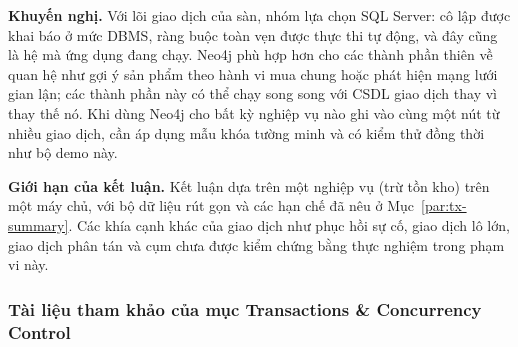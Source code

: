 \textbf{Khuyến nghị.} Với lõi giao dịch của sàn, nhóm lựa chọn SQL Server: cô lập được khai báo ở mức DBMS, ràng buộc toàn vẹn được thực thi tự động, và đây cũng là hệ mà ứng dụng đang chạy. Neo4j phù hợp hơn cho các thành phần thiên về quan hệ như gợi ý sản phẩm theo hành vi mua chung hoặc phát hiện mạng lưới gian lận; các thành phần này có thể chạy song song với CSDL giao dịch thay vì thay thế nó. Khi dùng Neo4j cho bất kỳ nghiệp vụ nào ghi vào cùng một nút từ nhiều giao dịch, cần áp dụng mẫu khóa tường minh và có kiểm thử đồng thời như bộ demo này.

\textbf{Giới hạn của kết luận.} Kết luận dựa trên một nghiệp vụ (trừ tồn kho) trên một máy chủ, với bộ dữ liệu rút gọn và các hạn chế đã nêu ở Mục~\ref{par:tx-summary}. Các khía cạnh khác của giao dịch như phục hồi sự cố, giao dịch lô lớn, giao dịch phân tán và cụm chưa được kiểm chứng bằng thực nghiệm trong phạm vi này.

\subsubsection*{Tài liệu tham khảo của mục Transactions \& Concurrency Control}

